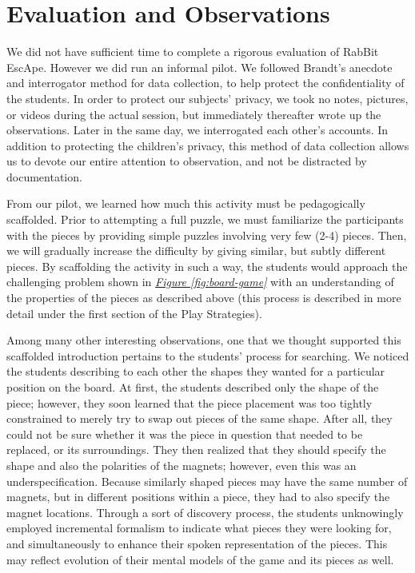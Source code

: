 \documentclass{acm_proc_article-sp}
\begin{document}
\section{Evaluation and Observations}
\label{sec:observations}
We did not have sufficient time to complete a rigorous evaluation of RabBit EscApe. 
However we did run an informal pilot. We followed Brandt's anecdote and interrogator method \cite{brandt1972studying} for data collection, to help protect the confidentiality of the students. 
In order to protect our subjects' privacy, we took no notes, pictures, or videos during the actual session, but immediately thereafter wrote up the observations.
Later in the same day, we interrogated each other's accounts. 
In addition to protecting the children's privacy, this method of data collection allows us to devote our entire attention to observation, and not be distracted by documentation.

From our pilot, we learned how much this activity must be pedagogically scaffolded. 
Prior to attempting a full puzzle, we must familiarize the participants with the pieces by providing simple puzzles involving very few (2-4) pieces. 
Then, we will gradually increase the difficulty by giving similar, but subtly different pieces. 
By scaffolding the activity in such a way, the students would approach the challenging problem shown in {\em \hyperref[fig:board-game]{Figure \ref{fig:board-game}}} with an understanding of the properties of the pieces as described above (this process is described in more detail under the first section of the Play Strategies).

Among many other interesting observations, one that we thought supported this scaffolded introduction pertains to the students' process for searching. 
We noticed the students describing to each other the shapes they wanted for a particular position on the board. 
At first, the students described only the shape of the piece; however, they soon learned that the piece placement was too tightly constrained to merely try to swap out pieces of the same shape. 
After all, they could not be sure whether it was the piece in question that needed to be replaced, or its surroundings. 
They then realized that they should specify the shape and also the polarities of the magnets; however, even this was an underspecification. 
Because similarly shaped pieces may have the same number of magnets, but in different positions within a piece, they had to also specify the magnet locations. 
Through a sort of discovery process, the students unknowingly employed incremental formalism\cite{shipman1999formality} to indicate what pieces they were looking for, and simultaneously to enhance their spoken representation of the pieces. 
This may reflect evolution of their mental models of the game and its pieces as well.
\end{document}
